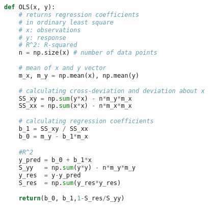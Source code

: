 \documentclass[graybox,sectrefs,envcountresetchap,open=right,final]{svmonodo}
\begin{document}
\begin{lstlisting}[language=python,style=blue1]
def OLS(x, y): 
    # returns regression coefficients
    # in ordinary least square
    # x: observations
    # y: response
    # R^2: R-squared
    n = np.size(x) # number of data points 
  
    # mean of x and y vector 
    m_x, m_y = np.mean(x), np.mean(y) 
  
    # calculating cross-deviation and deviation about x 
    SS_xy = np.sum(y*x) - n*m_y*m_x 
    SS_xx = np.sum(x*x) - n*m_x*m_x 
  
    # calculating regression coefficients 
    b_1 = SS_xy / SS_xx 
    b_0 = m_y - b_1*m_x

    #R^2
    y_pred = b_0 + b_1*x
    S_yy   = np.sum(y*y) - n*m_y*m_y
    y_res  = y-y_pred  
    S_res  = np.sum(y_res*y_res)
  
    return(b_0, b_1,1-S_res/S_yy)

\end{lstlisting}
\end{document}
